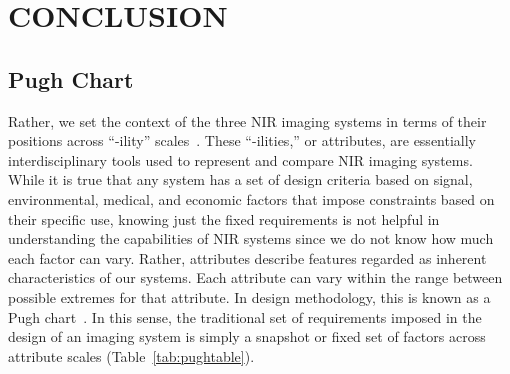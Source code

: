 \chapter{CONCLUSION} %
\label{chap:conclusion}


\section{Pugh Chart}

Rather, we set the context of the three \ac{NIR} imaging systems in terms of their positions across ``-ility'' scales~\cite{DeWeck2012}. These ``-ilities,'' or attributes, are essentially interdisciplinary tools used to represent and compare \ac{NIR} imaging systems. While it is true that any system has a set of design criteria based on signal, environmental, medical, and economic factors that impose constraints based on their specific use, knowing just the fixed requirements is not helpful in understanding the capabilities of \ac{NIR} systems since we do not know how much each factor can vary. Rather, attributes describe features regarded as inherent characteristics of our systems. 
Each attribute can vary within the range between possible extremes for that attribute. In design methodology, this is known as a Pugh chart~\cite{Pugh1981}.  In this sense, the traditional set of requirements imposed in the design of an imaging system is simply a snapshot or fixed set of factors across attribute scales (Table~\ref{tab:pughtable}). 


